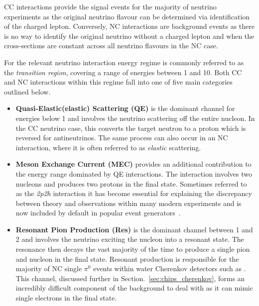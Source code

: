 CC interactions provide the signal events for the majority of neutrino experiments as the original
neutrino flavour can be determined via identification of the charged lepton. Conversely, NC
interactions are background events as there is no way to identify the original neutrino without a
charged lepton and when the cross-sections are constant across all neutrino flavours in the NC
case.

For \chips the relevant neutrino interaction energy regime is commonly referred to as the
\emph{transition region}, covering a range of energies between 1 and \unit{10}{\GeV}. Both CC and
NC interactions within this regime fall into one of five main categories outlined below.

\begin{itemize}
    \item \textbf{Quasi-Elastic(elastic) Scattering (QE)} is the dominant channel for energies
          below \unit{1}{\GeV} and involves the neutrino scattering off the entire nucleon. In the
          CC neutrino case, this converts the target neutron to a proton which is reversed for
          antineutrinos. The same process can also occur in an NC interaction, where it is often
          referred to as \emph{elastic} scattering.

    \item \textbf{Meson Exchange Current (MEC)} provides an additional contribution to the energy
          range dominated by QE interactions. The interaction involves two nucleons and produces
          two protons in the final state. Sometimes referred to as the \emph{2p2h} interaction it
          has become essential for explaining the discrepancy between theory and observations
          within many modern experiments and is now included by default in popular event
          generators~\cite{katori2013}.

    \item \textbf{Resonant Pion Production (Res)} is the dominant channel between 1 and
          \unit{2}{\GeV} and involves the neutrino exciting the nucleon into a resonant state. The
          resonance then decays the vast majority of the time to produce a single pion and nucleon
          in the final state. Resonant production is responsible for the majority of NC single
          $\pi^{0}$ events within water Cherenkov detectors such as \chips. This channel,
          discussed further in Section.~\ref{sec:chips_cherenkov}, forms an incredibly difficult
          component of the background to deal with as it can mimic single electrons in the final
          state.


\end{itemize}
